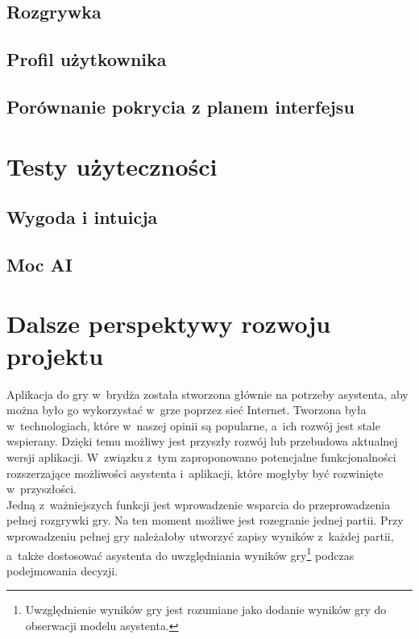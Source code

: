 \subsection{Rozgrywka}

\subsection{Profil użytkownika}

\subsection{Porównanie pokrycia z planem interfejsu}


\section{Testy użyteczności}

\subsection{Wygoda i intuicja}
\subsection{Moc AI}


\section{Dalsze perspektywy rozwoju projektu}

Aplikacja do gry w~brydża została stworzona głównie
na potrzeby asystenta, aby można było go wykorzystać w~grze
poprzez sieć Internet. Tworzona była w~technologiach, które
w~naszej opinii są popularne, a~ich rozwój jest stale wspierany.
Dzięki temu możliwy jest przyszły rozwój lub przebudowa aktualnej
wersji aplikacji.
W~związku z~tym zaproponowano potencjalne funkcjonalności rozszerzające
możliwości asystenta i~aplikacji, które
mogłyby być rozwinięte w~przyszłości. \\

Jedną z~ważniejszych funkcji jest wprowadzenie wsparcia do
przeprowadzenia pełnej rozgrywki gry. Na ten moment możliwe jest
rozegranie jednej partii. Przy wprowadzeniu pełnej gry należałoby
utworzyć zapisy wyników z~każdej partii, a~także dostosować asystenta
do uwzględniania wyników gry\footnote{Uwzględnienie wyników gry jest
    rozumiane jako dodanie wyników gry do obserwacji modelu asystenta.}
podczas podejmowania decyzji. \\

